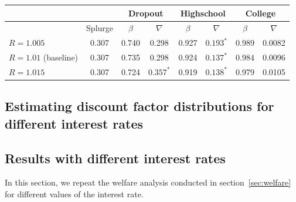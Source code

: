 \documentclass[\latexroot/\projectname]{subfiles}
\begin{document}
\begin{center}
  \begin{tabular}{lc|cccccc}
    \toprule
                          &         & \multicolumn{2}{c}{Dropout} & \multicolumn{2}{c}{Highschool} & \multicolumn{2}{c}{College}                                    \\ \midrule
                          & Splurge & $\beta$                     & $\nabla$                       & $\beta$                     & $\nabla$    & $\beta$ & $\nabla$ \\ \midrule
    $R = 1.005$           & 0.307   & 0.740                       & 0.298                          & 0.927                       & $0.193^{*}$ & 0.989   & 0.0082   \\
    $R = 1.01$ (baseline) & 0.307   & 0.735                       & 0.298                          & 0.924                       & $0.137^{*}$ & 0.984   & 0.0096   \\
    $R = 1.015$           & 0.307   & 0.724                       & $0.357^{*}$                    & 0.919                       & $0.138^{*}$ & 0.979   & 0.0105
    \\ \bottomrule
  \end{tabular}
  \label{tab:robustness_R}
\end{center}


\subsection*{Estimating discount factor distributions for different interest rates}
\whenintegrated{\label{app:DF_R}} %

\subsection*{Results with different interest rates}
\whenintegrated{\label{sec:robust_R_results}} %

In this section, we repeat the welfare analysis conducted in section~\ref{sec:welfare} for different values of the interest rate.
\end{document}

